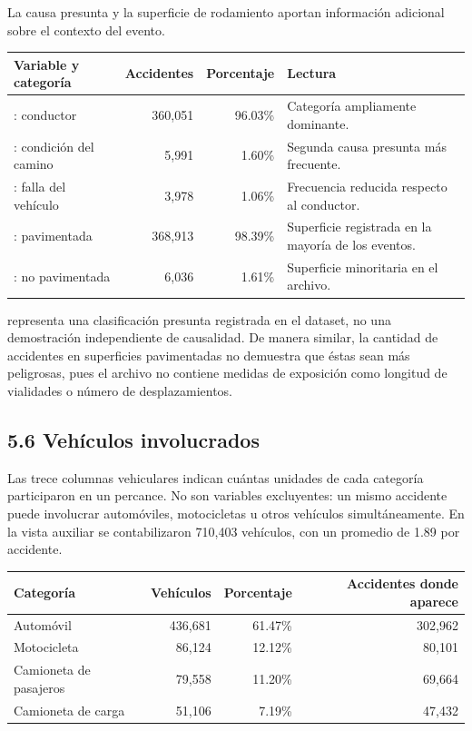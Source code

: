 \documentclass[11pt,letterpaper]{article}
\begin{document}
\begin{nota}
La causa presunta y la superficie de rodamiento aportan información adicional
sobre el contexto del evento.

\vspace{0.4em}
\begin{tabularx}{\textwidth}{L{4.2cm}rrY}
    \toprule
    \textbf{Variable y categoría} & \textbf{Accidentes} & \textbf{Porcentaje}
        & \textbf{Lectura} \\
    \midrule
    : conductor & 360,051 & 96.03\%
        & Categoría ampliamente dominante. \\
    : condición del camino & 5,991 & 1.60\%
        & Segunda causa presunta más frecuente. \\
    : falla del vehículo & 3,978 & 1.06\%
        & Frecuencia reducida respecto al conductor. \\
    : pavimentada & 368,913 & 98.39\%
        & Superficie registrada en la mayoría de los eventos. \\
    : no pavimentada & 6,036 & 1.61\%
        & Superficie minoritaria en el archivo. \\
    \bottomrule
\end{tabularx}

\vspace{0.4em}
 representa una clasificación presunta registrada en el dataset,
no una demostración independiente de causalidad. De manera similar, la cantidad
de accidentes en superficies pavimentadas no demuestra que éstas sean más
peligrosas, pues el archivo no contiene medidas de exposición como longitud de
vialidades o número de desplazamientos.
\end{nota}

\subsection*{5.6 Vehículos involucrados}

\begin{nota}
Las trece columnas vehiculares indican cuántas unidades de cada categoría
participaron en un percance. No son variables excluyentes: un mismo accidente
puede involucrar automóviles, motocicletas u otros vehículos simultáneamente.
En la vista auxiliar se contabilizaron 710,403 vehículos, con un promedio de
1.89 por accidente.

\vspace{0.4em}
\begin{tabularx}{0.92\textwidth}{Yrrr}
    \toprule
    \textbf{Categoría} & \textbf{Vehículos} & \textbf{Porcentaje}
        & \textbf{Accidentes donde aparece} \\
    \midrule
    Automóvil & 436,681 & 61.47\% & 302,962 \\
    Motocicleta & 86,124 & 12.12\% & 80,101 \\
    Camioneta de pasajeros & 79,558 & 11.20\% & 69,664 \\
    Camioneta de carga & 51,106 & 7.19\% & 47,432 \\
    \bottomrule
\end{tabularx}
\end{nota}
\end{document}
